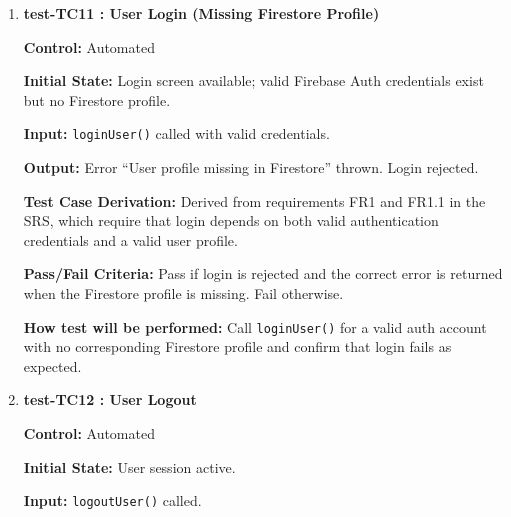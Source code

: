\documentclass[12pt, titlepage]{article}
\begin{document}
\begin{enumerate}
	\textbf{Input:} \texttt{loginUser()} called with valid patient credentials.
	
	\textbf{Output:} Login returns object with \texttt{uid} and profile data including \texttt{role="patient"}. No errors thrown.
	
	\textbf{Test Case Derivation:} Derived from requirements FR1 and FR1.1 in the SRS, which state that registered patients must be able to log in using valid credentials.
	
	\textbf{Pass/Fail Criteria:} Pass if login succeeds and the correct patient profile is returned. Fail otherwise.
	
	\textbf{How test will be performed:} Call \texttt{loginUser()} with valid patient credentials and verify that authentication and profile retrieval both succeed.
	
	
	\vspace{0.5em}
	
	\item \textbf{test-TC11 : User Login (Missing Firestore Profile)}
	
	\textbf{Control:} Automated
	
	\textbf{Initial State:} Login screen available; valid Firebase Auth credentials exist but no Firestore profile.
	
	\textbf{Input:} \texttt{loginUser()} called with valid credentials.
	
	\textbf{Output:} Error ``User profile missing in Firestore'' thrown. Login rejected.
	
	\textbf{Test Case Derivation:} Derived from requirements FR1 and FR1.1 in the SRS, which require that login depends on both valid authentication credentials and a valid user profile.
	
	\textbf{Pass/Fail Criteria:} Pass if login is rejected and the correct error is returned when the Firestore profile is missing. Fail otherwise.
	
	\textbf{How test will be performed:} Call \texttt{loginUser()} for a valid auth account with no corresponding Firestore profile and confirm that login fails as expected.
	
	
	\vspace{0.5em}
	
	\item \textbf{test-TC12 : User Logout}
	
	\textbf{Control:} Automated
	
	\textbf{Initial State:} User session active.
	
	\textbf{Input:} \texttt{logoutUser()} called.
	

\end{enumerate}
\end{document}
